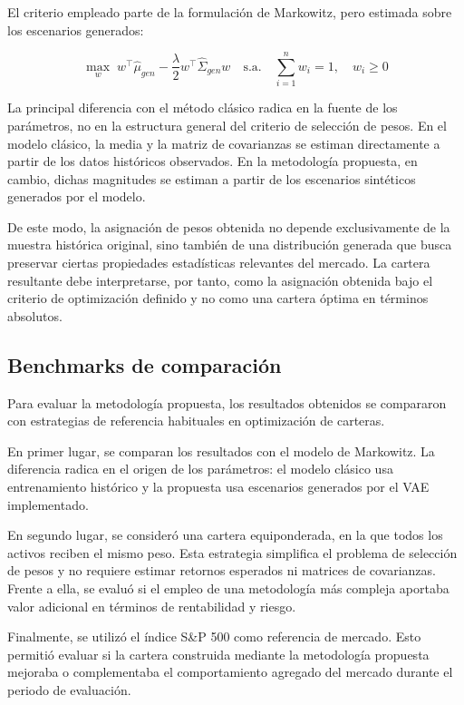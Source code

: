 El criterio empleado parte de la formulación de Markowitz, pero estimada sobre los escenarios generados:

\begin{equation}
\max_{w}
\; w^{\top}\hat{\mu}_{gen}
-
\frac{\lambda}{2}
w^{\top}\hat{\Sigma}_{gen}w
\quad
\text{s.a.}
\quad
\sum_{i=1}^{n} w_i = 1,
\quad
w_i \geq 0
\end{equation}

La principal diferencia con el método clásico radica en la fuente de los parámetros, no en la estructura general del criterio de selección de pesos. En el modelo clásico, la media y la matriz de covarianzas se estiman directamente a partir de los datos históricos observados. En la metodología propuesta, en cambio, dichas magnitudes se estiman a partir de los escenarios sintéticos generados por el modelo.

De este modo, la asignación de pesos obtenida no depende exclusivamente de la muestra histórica original, sino también de una distribución generada que busca preservar ciertas propiedades estadísticas relevantes del mercado. La cartera resultante debe interpretarse, por tanto, como la asignación obtenida bajo el criterio de optimización definido y no como una cartera óptima en términos absolutos.

\subsection{Benchmarks de comparación}

Para evaluar la metodología propuesta, los resultados obtenidos se compararon con estrategias de referencia habituales en optimización de carteras.

En primer lugar, se comparan los resultados con el modelo de Markowitz. La diferencia radica en el origen de los parámetros: el modelo clásico usa entrenamiento histórico y la propuesta usa escenarios generados por el VAE implementado.

En segundo lugar, se consideró una cartera equiponderada, en la que todos los activos reciben el mismo peso. Esta estrategia simplifica el problema de selección de pesos y no requiere estimar retornos esperados ni matrices de covarianzas. Frente a ella, se evaluó si el empleo de una metodología más compleja aportaba valor adicional en términos de rentabilidad y riesgo.

Finalmente, se utilizó el índice S\&P 500 como referencia de mercado. Esto permitió evaluar si la cartera construida mediante la metodología propuesta mejoraba o complementaba el comportamiento agregado del mercado durante el periodo de evaluación.

